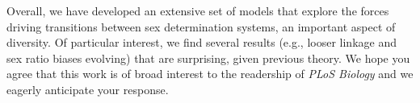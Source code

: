 \documentclass[12pt,letterpaper]{article}
\begin{document}

Overall, we have developed an extensive set of models that explore the forces driving transitions between sex determination systems, an important aspect of diversity. 
Of particular interest, we find several results (e.g., looser linkage and sex ratio biases evolving) that are surprising, given previous theory. 
We hope you agree that this work is of broad interest to the readership of \textit{PLoS Biology} and we eagerly anticipate your response. \\
\end{document}
